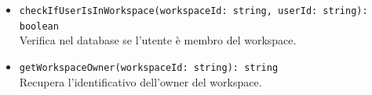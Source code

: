 \documentclass[a4paper, 11pt]{article}
\begin{document}
\begin{itemize}
\begin{itemize}
\begin{itemize}
\begin{itemize}
                \item \texttt{checkIfUserIsInWorkspace(workspaceId: string, userId: string): boolean} \\
                Verifica nel database se l'utente è membro del workspace.
                
                \item \texttt{getWorkspaceOwner(workspaceId: string): string} \\
                Recupera l'identificativo dell'owner del workspace.
            \end{itemize}
          \end{itemize}

    \end{itemize}

\end{itemize}
\end{document}

